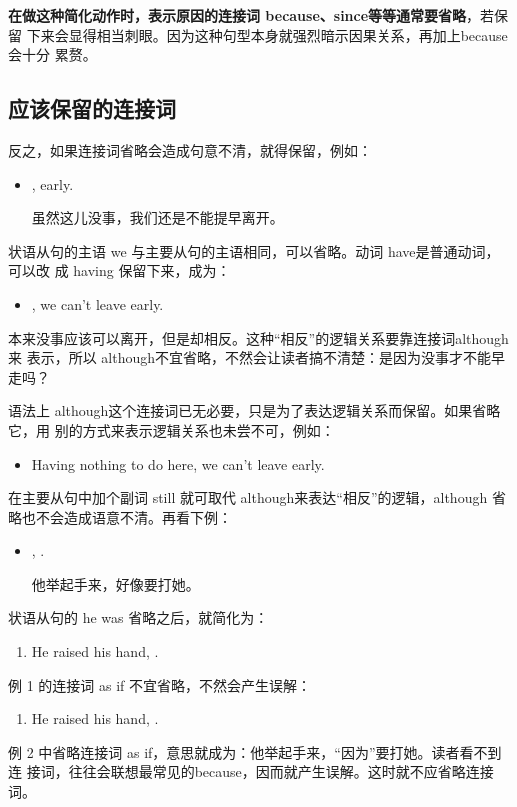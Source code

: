 \textbf{在做这种简化动作时，表示原因的连接词 because、since等等通常要省略}，若保留
下来会显得相当刺眼。因为这种句型本身就强烈暗示因果关系，再加上because 会十分
累赘。

\subsection{应该保留的连接词}

反之，如果连接词省略会造成句意不清，就得保留，例如：
\begin{itemize}
\item {},   early.

  虽然这儿没事，我们还是不能提早离开。
\end{itemize}
状语从句的主语 we 与主要从句的主语相同，可以省略。动词 have是普通动词，可以改
成 having 保留下来，成为：
\begin{itemize}
\item {}, we can't leave early.
\end{itemize}
本来没事应该可以离开，但是却相反。这种“相反”的逻辑关系要靠连接词although 来
表示，所以 although不宜省略，不然会让读者搞不清楚：是因为没事才不能早走吗？

语法上 although这个连接词已无必要，只是为了表达逻辑关系而保留。如果省略它，用
别的方式来表示逻辑关系也未尝不可，例如：
\begin{itemize}
\item Having nothing to do here, we  can't leave early.
\end{itemize}
在主要从句中加个副词 still 就可取代 although来表达“相反”的逻辑，although 省
略也不会造成语意不清。再看下例：
\begin{itemize}
\item {}  , .

  他举起手来，好像要打她。
\end{itemize}
状语从句的 he was 省略之后，就简化为：
\begin{enumerate}
\item He raised his hand, .
\end{enumerate}

例 1 的连接词 as if 不宜省略，不然会产生误解：
\begin{enumerate}[resume]
\item He raised his hand, .
\end{enumerate}
例 2 中省略连接词 as if，意思就成为：他举起手来，“因为”要打她。读者看不到连
接词，往往会联想最常见的because，因而就产生误解。这时就不应省略连接词。

